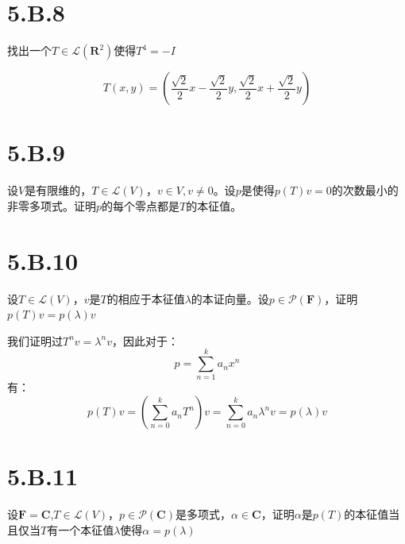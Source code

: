 \documentclass[10pt,a4paper,UTF8]{article}
\begin{document}
\section{5.B.8}
\label{sec:org8d7e15e}


\begin{problem}
找出一个\(T\in \mathcal{L}( \mathbf{R}^{2})\)使得\(T^{4} = -I\)
\end{problem}

\begin{answer}
\begin{equation}
\label{eq:6}
T(x,y) = (\frac{\sqrt{2}}{2} x - \frac{\sqrt{2}}{2} y, \frac{\sqrt{2}}{2}x + \frac{\sqrt{2}}{2} y)
\end{equation}
\end{answer}
\section{5.B.9}
\label{sec:org07719f5}


\begin{problem}
设\(V\)是有限维的，\(T\in \mathcal{L}(V)\)，\(v\in V,v\neq 0\)。设\(p\)是使得\(p(T)v = 0\)的次数最小的非零多项式。证明\(p\)的每个零点都是\(T\)的本征值。
\end{problem}
\section{5.B.10}
\label{sec:org7742542}


\begin{problem}
设\(T\in \mathcal{L}(V)\)，\(v\)是\(T\)的相应于本征值\(\lambda\)的本证向量。设\(p\in \mathcal{P}(\mathbf{F})\)，证明\(p(T)v = p(\lambda)v\)
\end{problem}

\begin{answer}
我们证明过\(T^{n}v = \lambda^{n}v\)，因此对于：\[p = \sum_{n=1}^{k}a_{n}x^{n}\]有：
\begin{equation}
\label{eq:7}
p(T)v = (\sum_{n=0}^{k}a_{n}T^{n})v = \sum_{n=0}^{k}a_{n}\lambda^{n}v = p(\lambda)v
\end{equation}
\end{answer}
\section{5.B.11}
\label{sec:org3701732}


\begin{problem}
设\(\mathbf{F}= \mathbf{C}\),\(T\in \mathcal{L}(V)\)，\(p\in \mathcal{P}(\mathbf{C})\)是多项式，\(\alpha \in \mathbf{C}\)，证明\(\alpha\)是\(p(T)\)的本征值当且仅当\(T\)有一个本征值\(\lambda\)使得\(\alpha = p(\lambda)\)
\end{problem}
\end{document}

